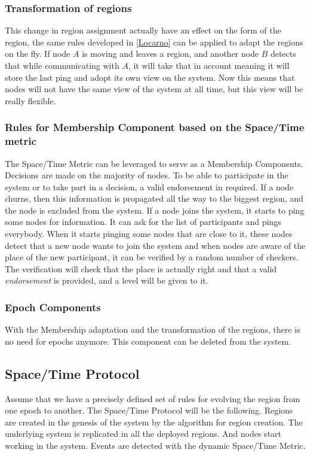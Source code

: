 \documentclass[a4paper,11pt,oneside]{report}
\begin{document}
\subsubsection{Transformation of regions}
This change in region assignment actually have an effect on the form of the
region, the same rules developed in \autoref{Locarno} can be applied to adapt
the regions on the fly. If node $A$ is moving and leaves a region, and another
node $B$ detects that while communicating with $A$, it will take that in
account meaning it will store the last ping and adopt its own view on the
system. Now this means that nodes will not have the same view of the system at
all time, but this view will be really flexible. 


\subsubsection{Rules for Membership Component based on the Space/Time metric}
The Space/Time Metric can be leveraged to serve as a Membership Components.
Decisions are made on the majority of nodes. To be able to participate in
the system or to take part in a decision, a valid endorsement in required. If a
node churns, then this information is propagated all the way to the
biggest region, and the node is excluded from the system.  If a node joins the
system, it starts to ping some nodes for information. It can ask for the list
of participants and pings everybody. When it starts pinging some nodes that are
close to it, these nodes detect that a new node wants to join the system and
when nodes are aware of the place of the new participant, it can be verified by
a random number of checkers. The verification will check that the place is
actually right and that a valid \textit{endorsement} is provided, and a level
will be given to it. 

\subsubsection{Epoch Components}
With the Membership adaptation and the transformation of the regions, there is
no need for epochs anymore. This component can be deleted from the system. 

\subsection{Space/Time Protocol}
Assume that we have a precisely defined set of rules for evolving the region
from one epoch to another.  The Space/Time Protocol will be the following.
Regions are created in the genesis of the system by the algorithm for region
creation. The underlying system is replicated in all the deployed regions. And
nodes start working in the system. Events are detected with the dynamic
Space/Time Metric. 
\end{document}
